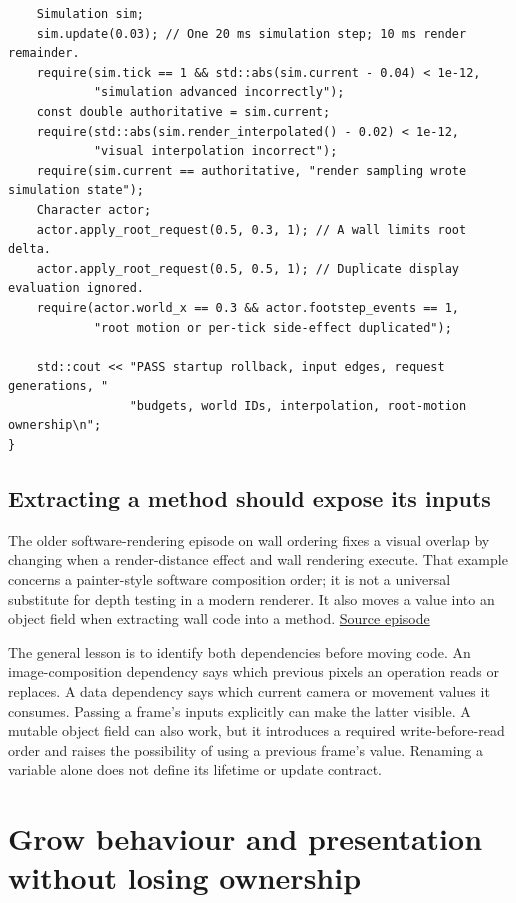 \begin{verbatim}
    Simulation sim;
    sim.update(0.03); // One 20 ms simulation step; 10 ms render remainder.
    require(sim.tick == 1 && std::abs(sim.current - 0.04) < 1e-12,
            "simulation advanced incorrectly");
    const double authoritative = sim.current;
    require(std::abs(sim.render_interpolated() - 0.02) < 1e-12,
            "visual interpolation incorrect");
    require(sim.current == authoritative, "render sampling wrote simulation state");
    Character actor;
    actor.apply_root_request(0.5, 0.3, 1); // A wall limits root delta.
    actor.apply_root_request(0.5, 0.5, 1); // Duplicate display evaluation ignored.
    require(actor.world_x == 0.3 && actor.footstep_events == 1,
            "root motion or per-tick side-effect duplicated");

    std::cout << "PASS startup rollback, input edges, request generations, "
                 "budgets, world IDs, interpolation, root-motion ownership\n";
}
\end{verbatim}

\subsection{Extracting a method should expose its inputs}\label{06-engine-ii-ch040-extracting-a-method-should-expose-its-inputs}

\hypertarget{06-engine-ii-ch040-extracting-a-method-should-expose-its-inputs}{}

The older software-rendering episode on wall ordering fixes a visual overlap by changing when a render-distance effect and wall rendering execute. That example concerns a painter-style software composition order; it is not a universal substitute for depth testing in a modern renderer. It also moves a value into an object field when extracting wall code into a method. \href{https://www.youtube.com/watch?v=98K5Bm2sApY}{Source episode}

The general lesson is to identify both dependencies before moving code. An image-composition dependency says which previous pixels an operation reads or replaces. A data dependency says which current camera or movement values it consumes. Passing a frame's inputs explicitly can make the latter visible. A mutable object field can also work, but it introduces a required write-before-read order and raises the possibility of using a previous frame's value. Renaming a variable alone does not define its lifetime or update contract.

\section{Grow behaviour and presentation without losing ownership}\label{06-engine-ii-ch040-grow-behaviour-and-presentation-without-losing-ownership}

